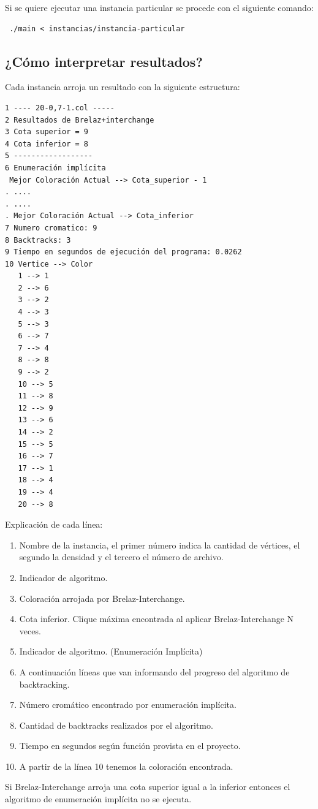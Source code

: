 \documentclass[a4paper,10pt]{article}
\begin{document}
Si se quiere ejecutar una instancia particular se procede con el
siguiente comando:

\begin{verbatim}
 ./main < instancias/instancia-particular
\end{verbatim}

\newpage
\subsection{¿Cómo interpretar resultados?}
Cada instancia arroja un resultado con la siguiente estructura:
\begin{verbatim}
1 ---- 20-0,7-1.col -----
2 Resultados de Brelaz+interchange 
3 Cota superior = 9                
4 Cota inferior = 8                
5 ------------------               
6 Enumeración implícita            
 Mejor Coloración Actual --> Cota_superior - 1
. ....
. ....
. Mejor Coloración Actual --> Cota_inferior
7 Numero cromatico: 9              
8 Backtracks: 3                    
9 Tiempo en segundos de ejecución del programa: 0.0262
10 Vertice --> Color                
   1 --> 1                          
   2 --> 6                          
   3 --> 2                          
   4 --> 3                          
   5 --> 3                          
   6 --> 7                          
   7 --> 4
   8 --> 8
   9 --> 2
   10 --> 5
   11 --> 8
   12 --> 9
   13 --> 6
   14 --> 2 
   15 --> 5
   16 --> 7
   17 --> 1
   18 --> 4
   19 --> 4
   20 --> 8
\end{verbatim}
Explicación de cada línea:
\begin{enumerate}
 \item Nombre de la instancia, el primer número indica la cantidad de vértices, el segundo la densidad y el tercero el número de archivo.
 \item Indicador de algoritmo.
 \item Coloración arrojada por Brelaz-Interchange.
 \item Cota inferior. Clique máxima encontrada al aplicar Brelaz-Interchange N veces.
 \item Indicador de algoritmo. (Enumeración Implícita)
 \item A continuación líneas que van informando del progreso del
       algoritmo de backtracking.
 \item Número cromático encontrado por enumeración implícita.
 \item Cantidad de backtracks realizados por el algoritmo.
 \item Tiempo en segundos según función provista en el proyecto.
 \item A partir de la l\'inea 10 tenemos la coloraci\'on encontrada.
\end{enumerate}
Si Brelaz-Interchange arroja una cota superior igual a la inferior
entonces el algoritmo de enumeración implícita no se ejecuta.
\end{document}
